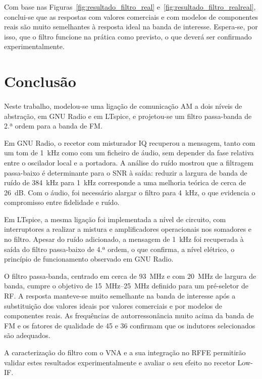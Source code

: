 \documentclass[11pt,a4paper]{article}
\begin{document}
Com base nas Figuras~\ref{fig:resultado_filtro_real} e~\ref{fig:resultado_filtro_realreal},
conclui-se que as respostas com valores comerciais e com modelos de componentes reais são muito semelhantes à
resposta ideal na banda de interesse. Espera-se, por isso, que o filtro funcione na prática como previsto, o que
deverá ser confirmado experimentalmente.

\section{Conclusão}\paragraph{}

Neste trabalho, modelou-se uma ligação de comunicação AM a dois níveis de abstração, em GNU Radio e em LTspice,
e projetou-se um filtro passa-banda de 2.ª ordem para a banda de FM.

Em GNU Radio, o recetor com misturador IQ recuperou a mensagem, tanto com um tom de \SI{1}{kHz} como com um
ficheiro de áudio, sem depender da fase relativa entre o oscilador local e a portadora. A análise do ruído mostrou
que a filtragem passa-baixo é determinante para o SNR à saída: reduzir a largura de banda de ruído de
\SI{384}{kHz} para \SI{1}{kHz} corresponde a uma melhoria teórica de cerca de \SI{26}{dB}. Com o áudio, foi
necessário alargar o filtro para \SI{4}{kHz}, o que evidencia o compromisso entre fidelidade e ruído.

Em LTspice, a mesma ligação foi implementada a nível de circuito, com interruptores a realizar a mistura e
amplificadores operacionais nos somadores e no filtro. Apesar do ruído adicionado, a mensagem de \SI{1}{kHz} foi
recuperada à saída do filtro passa-baixo de 4.ª ordem, o que confirma, a nível elétrico, o princípio de
funcionamento observado em GNU Radio.

O filtro passa-banda, centrado em cerca de \SI{93}{MHz} e com \SI{20}{MHz} de largura de banda, cumpre o objetivo
de \SIrange{15}{25}{MHz} definido para um pré-seletor de RF. A resposta manteve-se muito semelhante na banda de
interesse após a substituição dos valores ideais por valores comerciais e por modelos de componentes reais. As
frequências de autorressonância muito acima da banda de FM e os fatores de qualidade de 45 e 36 confirmam que os
indutores selecionados são adequados.

A caracterização do filtro com o VNA e a sua integração no RFFE permitirão validar estes resultados
experimentalmente e avaliar o seu efeito no recetor Low-IF.
\end{document}

